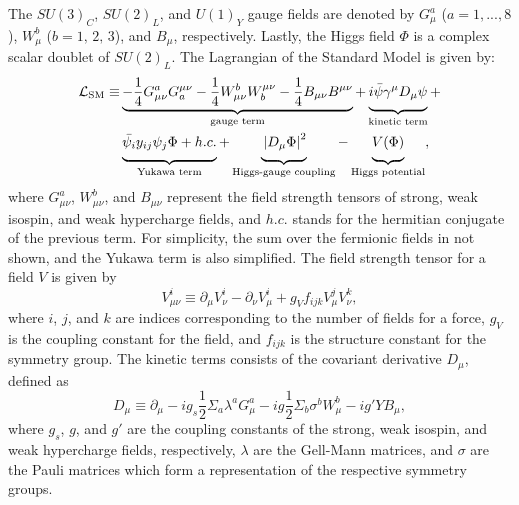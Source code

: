The $SU(3)_C$, $SU(2)_L$, and $U(1)_Y$ gauge fields are denoted by $G_\mu^a$ ($a=1,...,8$), $W_\mu^b$ ($b=1,\,2,\,3$), and $B_\mu$, respectively. Lastly, the Higgs field $\Phi$ is a complex scalar doublet of $SU(2)_L$. The Lagrangian of the Standard Model is given by:
\begin{equation}
\begin{split}    
    \mathcal{L}_{\mathrm{SM}}\equiv &
    \underbrace{-\frac{1}{4}G_{\mu\nu}^a G^{\mu\nu}_a-\frac{1}{4}W_{\mu\nu}^b W^{\mu\nu}_b-\frac{1}{4}B_{\mu\nu}B^{\mu\nu}}_\text{gauge term}+
    \underbrace{\vphantom{\frac{.}{.}}i \bar{\psi} \gamma^\mu D_\mu \psi}_\text{kinetic term}+ \\
    & \underbrace{\vphantom{\frac{.}{.}}\bar{\psi_i} y_{i j} \psi_j \Phi+h.c.}_\text{Yukawa term}+
    \underbrace{\vphantom{\frac{.}{.}}\left|D_\mu \Phi\right|^2}_\text{Higgs-gauge coupling}-
    \underbrace{\vphantom{\frac{.}{.}}V(\Phi)}_\text{Higgs potential}
    ,
\end{split}
\end{equation}
where $G_{\mu\nu}^a$, $W_{\mu\nu}^b$, and $B_{\mu\nu}$ represent the field strength tensors of strong, weak isospin, and weak hypercharge fields, and $h.c.$ stands for the hermitian conjugate of the previous term. For simplicity, the sum over the fermionic fields in not shown, and the Yukawa term is also simplified. The field strength tensor for a field $V$ is given by
\begin{equation}
    V_{\mu\nu}^i \equiv \partial_\mu V_\nu^i - \partial_\nu V_\mu^i + g_V f_{ijk} V_\mu^jV_\nu^k,
\end{equation}
where $i$, $j$, and $k$ are indices corresponding to the number of fields for a force, $g_V$ is the coupling constant for the field, and $f_{ijk}$ is the structure constant for the symmetry group. The kinetic terms consists of the covariant derivative $D_\mu$, defined as
\begin{equation}
    D_\mu \equiv \partial_\mu - i g_s\frac{1}{2}\Sigma_a\lambda^a G_\mu^a -i g \frac{1}{2}\Sigma_b\sigma^b W_\mu^b -i g' Y B_\mu, 
\end{equation}
where $g_s$, $g$, and $g'$ are the coupling constants of the strong, weak isospin, and weak hypercharge fields, respectively, $\lambda$ are the Gell-Mann matrices, and $\sigma$ are the Pauli matrices which form a representation of the respective symmetry groups.

